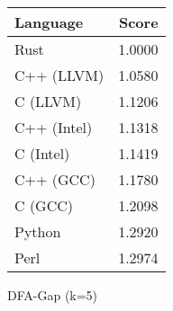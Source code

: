 \begin{subtable}{0.33\textwidth}
    \centering
    \begin{tabular}{|l|r|}
        \hline
        Language & Score \\
        \hline
        Rust & 1.0000 \\
        C++ (LLVM) & 1.0580 \\
        C (LLVM) & 1.1206 \\
        C++ (Intel) & 1.1318 \\
        C (Intel) & 1.1419 \\
        C++ (GCC) & 1.1780 \\
        C (GCC) & 1.2098 \\
        Python & 1.2920 \\
        Perl & 1.2974 \\
        \hline
    \end{tabular}
    \caption{DFA-Gap (k=5)}
    \label{table:energy:dfa_gap(5)}
\end{subtable}
